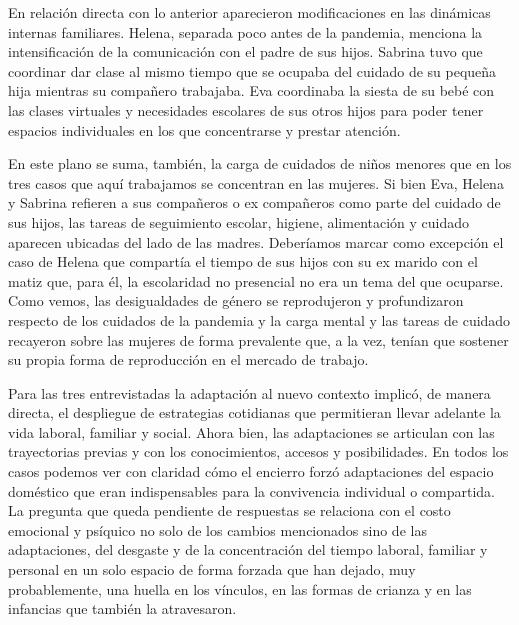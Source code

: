 \begin{refsection}
En relación directa con lo anterior aparecieron modificaciones en las dinámicas internas familiares. Helena, separada poco antes de la pandemia, menciona la intensificación de la comunicación con el padre de sus hijos. Sabrina tuvo que coordinar dar clase al mismo tiempo que se ocupaba del cuidado de su pequeña hija mientras su compañero trabajaba. Eva coordinaba la siesta de su bebé con las clases virtuales y necesidades escolares de sus otros hijos para poder tener espacios individuales en los que concentrarse y prestar atención.

En este plano se suma, también, la carga de cuidados de niños menores que en los tres casos que aquí trabajamos se concentran en las mujeres. Si bien Eva, Helena y Sabrina refieren a sus compañeros o ex compañeros como parte del cuidado de sus hijos, las tareas de seguimiento escolar, higiene, alimentación y cuidado aparecen ubicadas del lado de las madres. Deberíamos marcar como excepción el caso de Helena que compartía el tiempo de sus hijos con su ex marido con el matiz que, para él, la escolaridad no presencial no era un tema del que ocuparse. Como vemos, las desigualdades de género se reprodujeron y profundizaron respecto de los cuidados de la pandemia y la carga mental y las tareas de cuidado recayeron sobre las mujeres de forma prevalente que, a la vez, tenían que sostener su propia forma de reproducción en el mercado de trabajo.

Para las tres entrevistadas la adaptación al nuevo contexto implicó, de manera directa, el despliegue de estrategias cotidianas que permitieran llevar adelante la vida laboral, familiar y social. Ahora bien, las adaptaciones se articulan con las trayectorias previas y con los conocimientos, accesos y posibilidades. En todos los casos podemos ver con claridad cómo el encierro forzó adaptaciones del espacio doméstico que eran indispensables para la convivencia individual o compartida. La pregunta que queda pendiente de respuestas se relaciona con el costo emocional y psíquico no solo de los cambios mencionados sino de las adaptaciones, del desgaste y de la concentración del tiempo laboral, familiar y personal en un solo espacio de forma forzada que han dejado, muy probablemente, una huella en los vínculos, en las formas de crianza y en las infancias que también la atravesaron.


\section*{\refname}
\printbibliography[heading=none]
\end{refsection}

